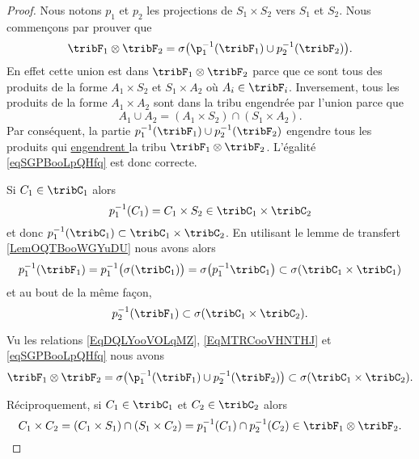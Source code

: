 \begin{proof}
    Nous notons \( p_1\) et \( p_2\) les projections de \( S_1\times S_2\) vers \( S_1\) et \( S_2\). Nous commençons par prouver que
    \begin{equation}    \label{eqSGPBooLpQHfq}
        \tribF_1\otimes \tribF_2=\sigma\big( \p_1^{-1}(\tribF_1)\cup p_2^{-1}(\tribF_2) \big).
    \end{equation}
    En effet cette union est dans \( \tribF_1\otimes \tribF_2\) parce que ce sont tous des produits de la forme \( A_1\times S_2\) et \( S_1\times A_2\) où \( A_i\in \tribF_i\). Inversement, tous les produits de la forme \( A_1\times A_2\) sont dans la tribu engendrée par l'union parce que
    \begin{equation}
        A_1\cup A_2=(A_1\times S_2)\cap(S_1\times A_2).
    \end{equation}
    Par conséquent, la partie \( p_1^{-1}(\tribF_1)\cup p_2^{-1}(\tribF_2)\) engendre tous les produits qui \href{https://fr.wikisource.org/wiki/Bible_Crampon_1923/Matthieu}{ engendrent } la tribu \( \tribF_1\otimes\tribF_2\). L'égalité \eqref{eqSGPBooLpQHfq} est donc correcte.
    
    Si \( C_1\in\tribC_1\) alors
    \begin{equation}
        p_1^{-1}(C_1)=C_1\times S_2\in\tribC_1\times \tribC_2
    \end{equation}
    et donc \( p_1^{-1}(\tribC_1)\subset \tribC_1\times \tribC_2\). En utilisant le lemme de transfert \ref{LemOQTBooWGYuDU} nous avons alors
    \begin{equation}        \label{EqDQLYooVOLqMZ}
        p_1^{-1}(\tribF_1)=p_1^{-1}\big( \sigma(\tribC_1) \big)=\sigma\big( p_1^{-1}\tribC_1 \big)\subset\sigma(\tribC_1\times \tribC_1)
    \end{equation}
    et au bout de la même façon,
    \begin{equation}        \label{EqMTRCooVHNTHJ}
        p_2^{-1}(\tribF_1)\subset\sigma(\tribC_1\times \tribC_2).
    \end{equation}

    Vu les relations \eqref{EqDQLYooVOLqMZ}, \eqref{EqMTRCooVHNTHJ} et \eqref{eqSGPBooLpQHfq} nous avons
    \begin{equation}
        \tribF_1\otimes\tribF_2=\sigma\big( \p_1^{-1}(\tribF_1)\cup p_2^{-1}(\tribF_2) \big)\subset\sigma(\tribC_1\times \tribC_2).
    \end{equation}

    Réciproquement, si \( C_1\in \tribC_1\) et \( C_2\in \tribC_2\) alors
    \begin{equation}
        C_1\times C_2=(C_1\times S_1)\cap(S_1\times C_2)=p_1^{-1}(C_1)\cap p_2^{-1}(C_2)\in\tribF_1\otimes\tribF_2.
    \end{equation}
\end{proof}


